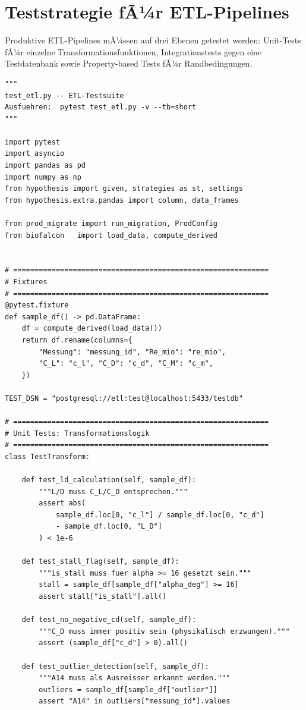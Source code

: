 ﻿\documentclass[12pt,a4paper]{report}
\theoremstyle{definition}
\theoremstyle{remark}
\begin{document}
\section{Teststrategie fÃ¼r ETL-Pipelines}

Produktive ETL-Pipelines mÃ¼ssen auf drei Ebenen getestet werden:
Unit-Tests fÃ¼r einzelne Transformationsfunktionen,
Integrationstests gegen eine Testdatenbank sowie
Property-based Tests fÃ¼r Randbedingungen.

\begin{lstlisting}[style=python, caption={test\_etl.py: VollstÃ¤ndige Testsuite mit pytest und hypothesis}]
"""
test_etl.py -- ETL-Testsuite
Ausfuehren:  pytest test_etl.py -v --tb=short
"""

import pytest
import asyncio
import pandas as pd
import numpy as np
from hypothesis import given, strategies as st, settings
from hypothesis.extra.pandas import column, data_frames

from prod_migrate import run_migration, ProdConfig
from biofalcon   import load_data, compute_derived


# ============================================================
# Fixtures
# ============================================================
@pytest.fixture
def sample_df() -> pd.DataFrame:
    df = compute_derived(load_data())
    return df.rename(columns={
        "Messung": "messung_id", "Re_mio": "re_mio",
        "C_L": "c_l", "C_D": "c_d", "C_M": "c_m",
    })

TEST_DSN = "postgresql://etl:test@localhost:5433/testdb"

# ============================================================
# Unit Tests: Transformationslogik
# ============================================================
class TestTransform:

    def test_ld_calculation(self, sample_df):
        """L/D muss C_L/C_D entsprechen."""
        assert abs(
            sample_df.loc[0, "c_l"] / sample_df.loc[0, "c_d"]
            - sample_df.loc[0, "L_D"]
        ) < 1e-6

    def test_stall_flag(self, sample_df):
        """is_stall muss fuer alpha >= 16 gesetzt sein."""
        stall = sample_df[sample_df["alpha_deg"] >= 16]
        assert stall["is_stall"].all()

    def test_no_negative_cd(self, sample_df):
        """C_D muss immer positiv sein (physikalisch erzwungen)."""
        assert (sample_df["c_d"] > 0).all()

    def test_outlier_detection(self, sample_df):
        """A14 muss als Ausreisser erkannt werden."""
        outliers = sample_df[sample_df["outlier"]]
        assert "A14" in outliers["messung_id"].values



\end{lstlisting}
\end{document}
